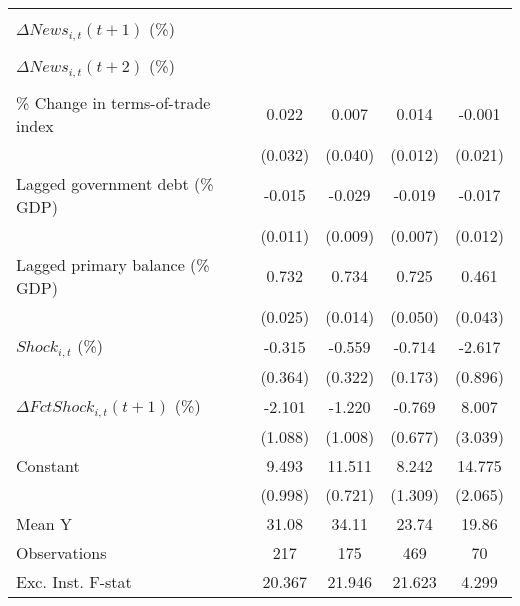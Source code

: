 {\begin{tabular}{l*{4}{c}}
                    &                     &                     &                     &                     \\
\addlinespace
$ \Delta News_{i,t}(t+1)$ (\%)&                     &                     &                     &                     \\
                    &                     &                     &                     &                     \\
\addlinespace
$ \Delta News_{i,t}(t+2)$ (\%)&                     &                     &                     &                     \\
                    &                     &                     &                     &                     \\
\addlinespace
\% Change in terms-of-trade index&       0.022         &       0.007         &       0.014         &      -0.001         \\
                    &     (0.032)         &     (0.040)         &     (0.012)         &     (0.021)         \\
\addlinespace
Lagged government debt (\% GDP)&      -0.015         &      -0.029\sym{**} &      -0.019\sym{**} &      -0.017         \\
                    &     (0.011)         &     (0.009)         &     (0.007)         &     (0.012)         \\
\addlinespace
Lagged primary balance (\% GDP)&       0.732\sym{***}&       0.734\sym{***}&       0.725\sym{***}&       0.461\sym{***}\\
                    &     (0.025)         &     (0.014)         &     (0.050)         &     (0.043)         \\
\addlinespace
$ Shock_{i,t}$ (\%) &      -0.315         &      -0.559         &      -0.714\sym{***}&      -2.617\sym{**} \\
                    &     (0.364)         &     (0.322)         &     (0.173)         &     (0.896)         \\
\addlinespace
$ \Delta FctShock_{i,t}(t+1)$ (\%)&      -2.101\sym{*}  &      -1.220         &      -0.769         &       8.007\sym{**} \\
                    &     (1.088)         &     (1.008)         &     (0.677)         &     (3.039)         \\
\addlinespace
Constant            &       9.493\sym{***}&      11.511\sym{***}&       8.242\sym{***}&      14.775\sym{***}\\
                    &     (0.998)         &     (0.721)         &     (1.309)         &     (2.065)         \\
\midrule
Mean Y              &       31.08         &       34.11         &       23.74         &       19.86         \\
Observations        &         217         &         175         &         469         &          70         \\
Exc. Inst. F-stat   &      20.367         &      21.946         &      21.623         &       4.299         \\
\bottomrule
\end{tabular}
}
